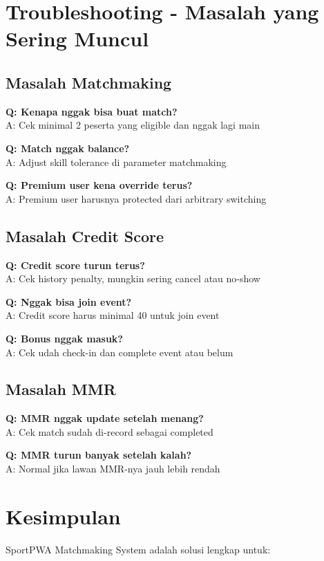 \documentclass[12pt]{article}
\begin{document}
\section{Troubleshooting - Masalah yang Sering Muncul}

\subsection{Masalah Matchmaking}

\textbf{Q: Kenapa nggak bisa buat match?}\\
A: Cek minimal 2 peserta yang eligible dan nggak lagi main

\textbf{Q: Match nggak balance?}\\
A: Adjust skill tolerance di parameter matchmaking

\textbf{Q: Premium user kena override terus?}\\
A: Premium user harusnya protected dari arbitrary switching

\subsection{Masalah Credit Score}

\textbf{Q: Credit score turun terus?}\\
A: Cek history penalty, mungkin sering cancel atau no-show

\textbf{Q: Nggak bisa join event?}\\
A: Credit score harus minimal 40 untuk join event

\textbf{Q: Bonus nggak masuk?}\\
A: Cek udah check-in dan complete event atau belum

\subsection{Masalah MMR}

\textbf{Q: MMR nggak update setelah menang?}\\
A: Cek match sudah di-record sebagai completed

\textbf{Q: MMR turun banyak setelah kalah?}\\
A: Normal jika lawan MMR-nya jauh lebih rendah

\section{Kesimpulan}

SportPWA Matchmaking System adalah solusi lengkap untuk:
\end{document}
